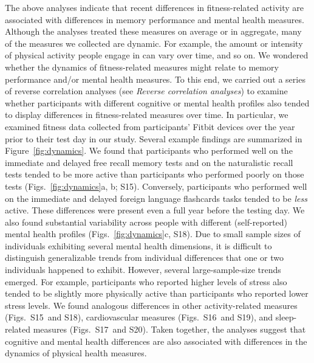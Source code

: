 \documentclass[10pt]{article}
\newcommand{\activityTimecourse}{S15}
\newcommand{\cardioTimecourse}{S16}
\newcommand{\sleepTimecourse}{S17}
\newcommand{\activityTimecourseMH}{S18}
\newcommand{\cardioTimecourseMH}{S19}
\newcommand{\sleepTimecourseMH}{S20}
\begin{document}
The above analyses indicate that recent differences in fitness-related
activity are associated with differences in memory performance and
mental health measures.  Although the analyses treated these measures
on average or in aggregate, many of the measures we collected are
dynamic. For example, the amount or intensity of physical activity
people engage in can vary over time, and so on.  We wondered whether
the dynamics of fitness-related measures might relate to memory
performance and/or mental health measures.  To this end, we carried out a
series of reverse correlation analyses (see \textit{Reverse
  correlation analyses}) to examine whether participants with
different cognitive or mental health profiles also tended to display
differences in fitness-related measures over time.  In particular, we
examined fitness data collected from participants' Fitbit devices over
the year prior to their test day in our study.  Several example findings are summarized in
Figure~\ref{fig:dynamics}.  We found that participants who performed
well on the immediate and delayed free recall memory tests and on the
naturalistic recall tests tended to be more active than participants
who performed poorly on those tests (Figs.~\ref{fig:dynamics}a, b;
\activityTimecourse).  Conversely, participants who performed well on
the immediate and delayed foreign language flashcards tasks tended to
be \textit{less} active.  These differences were present even a full
year before the testing day.  We also found substantial variability
across people with different (self-reported) mental health profiles
(Figs.~\ref{fig:dynamics}c, \activityTimecourseMH).  Due to small sample
sizes of individuals exhibiting several mental health dimensions, it
is difficult to distinguish generalizable trends from individual
differences that one or two individuals happened to exhibit.  However,
several large-sample-size trends emerged.  For example, participants
who reported higher levels of stress also tended to be slightly more
physically active than participants who reported lower stress levels.
We found analogous differences in other activity-related measures
(Figs.~\activityTimecourse~and \activityTimecourseMH), cardiovascular
measures (Figs.~\cardioTimecourse~and \cardioTimecourseMH), and
sleep-related measures (Figs.~\sleepTimecourse~and
\sleepTimecourseMH).  Taken together, the analyses suggest that
cognitive and mental health differences are also associated with differences
in the dynamics of physical health measures.
\end{document}
